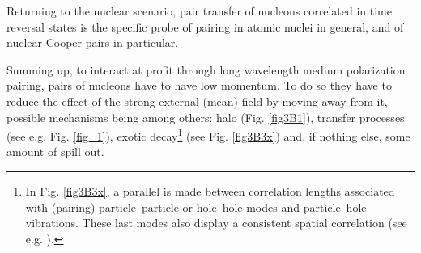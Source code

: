 Returning to the nuclear scenario, pair transfer of nucleons correlated in time reversal states is the specific probe of pairing in atomic nuclei in general, and of nuclear Cooper pairs in particular.

 Summing up, to interact at profit through long wavelength medium polarization pairing, pairs of nucleons have to have low momentum. To do so they have to reduce the effect of the strong external (mean) field by moving away from it, possible mechanisms being among others: halo (Fig. \ref{fig3B1}), transfer processes (see e.g. Fig. \ref{fig_1}), exotic decay\footnote{In Fig. \ref{fig3B3x}, a parallel is made between correlation lengths associated with (pairing) particle--particle or hole--hole modes and particle--hole vibrations. These last modes  also display a consistent spatial correlation (see e.g. \cite{Broglia:71}).} (see Fig. \ref{fig3B3x}) and, if nothing else, some amount of spill out.
